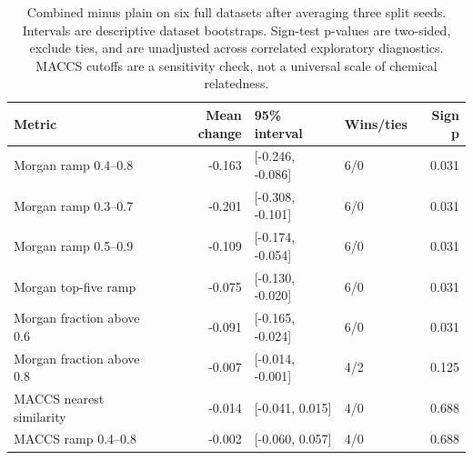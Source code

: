 \begin{table}[htbp]\centering\small
\begin{tabular}{lrllr}
\toprule
Metric & Mean change & 95\% interval & Wins/ties & Sign p \\
\midrule
Morgan ramp 0.4--0.8 & -0.163 & [-0.246, -0.086] & 6/0 & 0.031 \\
Morgan ramp 0.3--0.7 & -0.201 & [-0.308, -0.101] & 6/0 & 0.031 \\
Morgan ramp 0.5--0.9 & -0.109 & [-0.174, -0.054] & 6/0 & 0.031 \\
Morgan top-five ramp & -0.075 & [-0.130, -0.020] & 6/0 & 0.031 \\
Morgan fraction above 0.6 & -0.091 & [-0.165, -0.024] & 6/0 & 0.031 \\
Morgan fraction above 0.8 & -0.007 & [-0.014, -0.001] & 4/2 & 0.125 \\
MACCS nearest similarity & -0.014 & [-0.041, 0.015] & 4/0 & 0.688 \\
MACCS ramp 0.4--0.8 & -0.002 & [-0.060, 0.057] & 4/0 & 0.688 \\
\bottomrule
\end{tabular}
\caption{Combined minus plain on six full datasets after averaging three split seeds. Intervals are descriptive dataset bootstraps. Sign-test p-values are two-sided, exclude ties, and are unadjusted across correlated exploratory diagnostics. MACCS cutoffs are a sensitivity check, not a universal scale of chemical relatedness.}\end{table}
